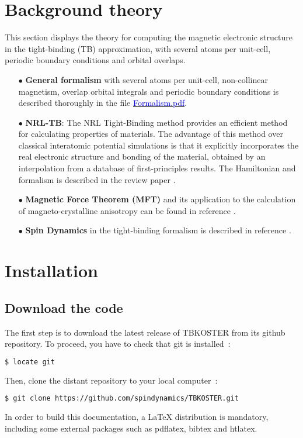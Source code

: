 \documentclass[12pt, onecolumn]{memoir}
\begin{document}
\mainmatter

\chapter{Background theory}

This section displays the theory for computing the magnetic electronic structure in the tight-binding (TB) approximation, with several atoms per unit-cell, periodic boundary conditions and orbital overlaps.

\begin{itemize}
  \item[$\bullet$]{\textbf{General formalism} with several atoms per unit-cell, non-collinear magnetism, overlap orbital integrals and periodic boundary conditions is described thoroughly in the file \href{https://fr.overleaf.com/read/hvmmbjspmtcg#e8c298}{\textcolor{blue}{Formalism.pdf}}.}
  \item[$\bullet$]{\textbf{NRL-TB}: The NRL Tight-Binding method provides an efficient method for calculating properties of materials. The advantage of this method over classical interatomic potential simulations is that it explicitly incorporates the real electronic structure and bonding of the material, obtained by an interpolation from a database of first-principles results. The Hamiltonian and formalism is described in the review paper \cite{barreteauEfficientMagneticTightbinding2016}.} 
  \item[$\bullet$]{\textbf{Magnetic Force Theorem (MFT)} and its application to the calculation of magneto-crystalline anisotropy can be found in reference \cite{liMagnetocrystallineAnisotropyEnergy2013}.
  }
  \item[$\bullet$]{\textbf{Spin Dynamics} in the tight-binding formalism is described in reference \cite{cardiasSpinDynamicsConstrained2021}.
  } 
\end{itemize}
\vfil

\chapter{Installation}

\section{Download the code}

The first step is to download the latest release of TBKOSTER from its github repository. To proceed, you have to check that git is installed~:
\begin{lstlisting}[language=bash,basicstyle=\small]
$ locate git
\end{lstlisting}
Then, clone the distant repository to your local computer~:
\begin{lstlisting}[language=bash,basicstyle=\small]
$ git clone https://github.com/spindynamics/TBKOSTER.git
\end{lstlisting}
In order to build this documentation, a LaTeX distribution is mandatory, including some external packages such as pdflatex, bibtex and htlatex.
\end{document}
